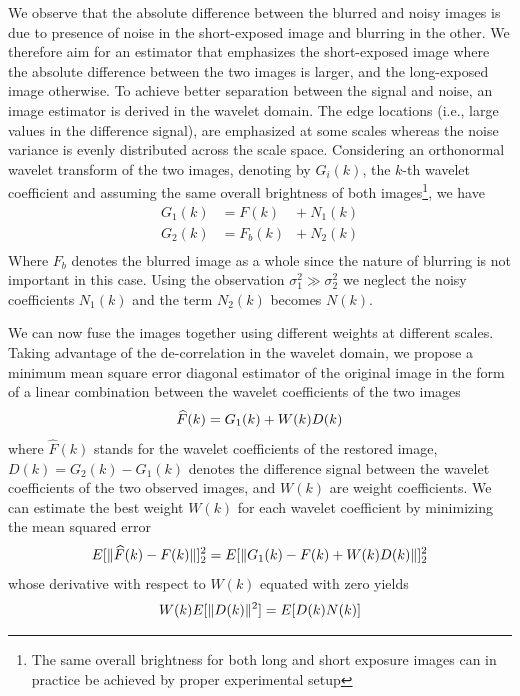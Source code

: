 \documentclass[12pt,notitlepage]{report}
\begin{document}
We observe that the absolute difference between the blurred and noisy images is due to presence of noise in the short-exposed image and blurring in the other. We therefore aim for an estimator that emphasizes the short-exposed image where the absolute difference between the two images is larger, and the long-exposed image otherwise. To achieve better separation between the signal and noise, an image estimator is derived in the wavelet domain. The edge locations (i.e., large values in the difference signal), are emphasized at some scales whereas the noise variance is evenly distributed across the scale space. Considering an orthonormal wavelet transform of the two images, denoting by $G_i(k)$, the $k$-th wavelet coefficient and assuming the same overall brightness of both images\footnote[4]{The same overall brightness for both long and short exposure images can in practice be achieved by proper experimental setup}, we have
\begin{equation}
	\label{eq:tico09_model}
	\begin{aligned}
		G_1(k) &= F(k) &+ \ N_1(k) \\
		G_2(k) &= F_b(k) &+ \ N_2(k) \\
	\end{aligned}
\end{equation}
Where $F_b$ denotes the blurred image as a whole since the nature of blurring is not important in this case. Using the observation $\sigma_1^2 \gg \sigma_2^2$ we neglect the noisy coefficients $N_1(k)$ and the term $N_2(k)$ becomes $N(k)$.

We can now fuse the images together using different weights at different scales.  Taking advantage of the de-correlation in the wavelet domain, we propose a minimum mean square error diagonal estimator of the original image in the form of a linear combination between the wavelet coefficients of the two images
\begin{equation}
\label{eq:tico09_estimator}
	\widehat{F}(k) = G_1(k) + W(k)D(k) \\
\end{equation}
where $\widehat{F}(k)$ stands for the wavelet coefficients of the restored image, $D(k) = G_2(k) - G_1(k)$ denotes the difference signal between the wavelet coefficients of the two observed images, and $W(k)$ are weight coefficients.  We can estimate the best weight $W(k)$ for each wavelet coefficient by minimizing the mean squared error
\begin{equation}
\label{eq:tico09_weight}
	E[\|\widehat{F}(k)- F(k)\|]_2^2 = E[\|G_1(k) - F(k) + W(k)D(k)\|]_2^2 \\
\end{equation}
whose derivative with respect to $W(k)$ equated with zero yields
\begin{equation}
\label{eq:tico09_weight_derivative}
	W(k)E[\|D(k)\|^2] = E[D(k)N(k)] \\
\end{equation}
\end{document}
